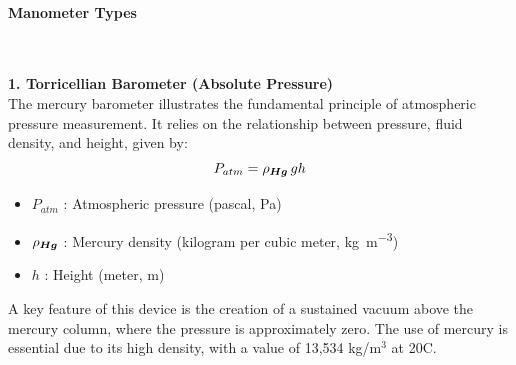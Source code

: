 \documentclass{article}
\begin{document}
\paragraph{Manometer Types}\mbox{}\\[1em]
\noindent
\begin{minipage}{0.65\textwidth}
	\textbf{1. Torricellian Barometer (Absolute Pressure)}\\[8pt]	
	The mercury barometer illustrates the fundamental principle of atmospheric pressure measurement. It relies on the relationship between pressure, fluid density, and height, given by:  
	\begin{equation}
		P_{atm} = \rho_{\tiny \bm{Hg}}\, g  h
	\end{equation}
	\begin{itemize}[itemsep=-1mm]
		\item $P_{atm}$ : Atmospheric pressure (pascal, \si{\Pa})
		\item $\rho_{\tiny \bm{Hg}}$ : Mercury density (kilogram per cubic meter, \si{\kg\per\m\cubed})
		\item $h$ : Height (meter, \si{\m})
	\end{itemize}
	A key feature of this device is the creation of a sustained vacuum above the mercury column, where the pressure is approximately zero. The use of mercury is essential due to its high density, with a value of 13,534 kg/m$^3$ at 20\textdegree C.
\end{minipage}\hfill
\end{document}
